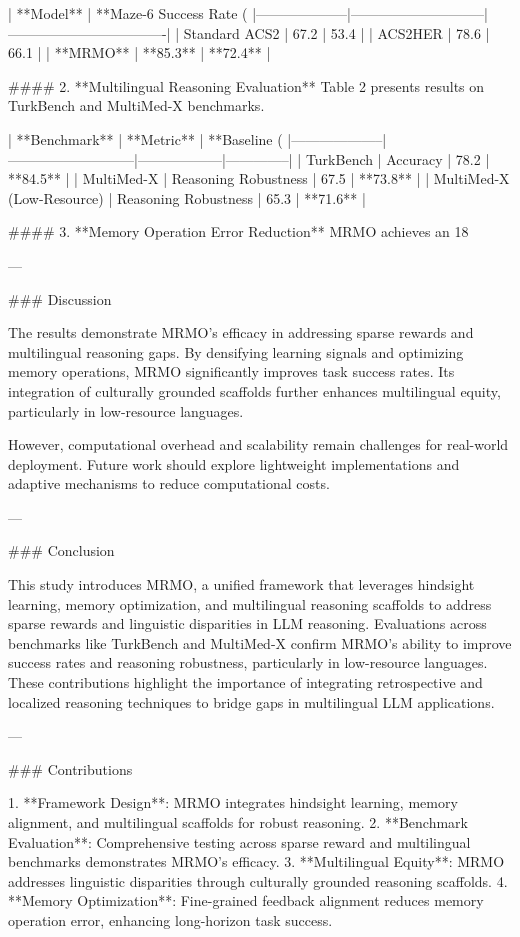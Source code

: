| **Model**         | **Maze-6 Success Rate (%
|--------------------|-----------------------------|----------------------------------|
| Standard ACS2      | 67.2                        | 53.4                            |
| ACS2HER            | 78.6                        | 66.1                            |
| **MRMO**           | **85.3**                   | **72.4**                        |

#### 2. **Multilingual Reasoning Evaluation**
Table 2 presents results on TurkBench and MultiMed-X benchmarks.

| **Benchmark**      | **Metric**                | **Baseline (%
|--------------------|---------------------------|------------------|--------------|
| TurkBench          | Accuracy                 | 78.2             | **84.5**     |
| MultiMed-X         | Reasoning Robustness     | 67.5             | **73.8**     |
| MultiMed-X (Low-Resource) | Reasoning Robustness | 65.3             | **71.6**     |

#### 3. **Memory Operation Error Reduction**
MRMO achieves an 18%

---

### Discussion

The results demonstrate MRMO's efficacy in addressing sparse rewards and multilingual reasoning gaps. By densifying learning signals and optimizing memory operations, MRMO significantly improves task success rates. Its integration of culturally grounded scaffolds further enhances multilingual equity, particularly in low-resource languages.

However, computational overhead and scalability remain challenges for real-world deployment. Future work should explore lightweight implementations and adaptive mechanisms to reduce computational costs.

---

### Conclusion

This study introduces MRMO, a unified framework that leverages hindsight learning, memory optimization, and multilingual reasoning scaffolds to address sparse rewards and linguistic disparities in LLM reasoning. Evaluations across benchmarks like TurkBench and MultiMed-X confirm MRMO's ability to improve success rates and reasoning robustness, particularly in low-resource languages. These contributions highlight the importance of integrating retrospective and localized reasoning techniques to bridge gaps in multilingual LLM applications.

---

### Contributions

1. **Framework Design**: MRMO integrates hindsight learning, memory alignment, and multilingual scaffolds for robust reasoning.
2. **Benchmark Evaluation**: Comprehensive testing across sparse reward and multilingual benchmarks demonstrates MRMO's efficacy.
3. **Multilingual Equity**: MRMO addresses linguistic disparities through culturally grounded reasoning scaffolds.
4. **Memory Optimization**: Fine-grained feedback alignment reduces memory operation error, enhancing long-horizon task success.

